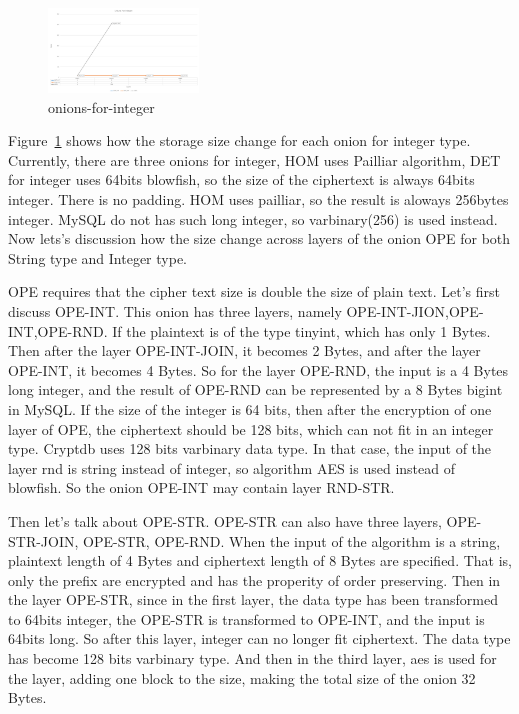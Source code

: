 \begin{figure}[tb]
\centering
\includegraphics[width=4cm]{images/onions-for-integer.png}
\caption{onions-for-integer}
\label{fig:stack6}
\end{figure}


Figure~\ref{fig:stack6} shows how the storage size change for each onion for integer type. Currently, there are three onions for integer, HOM uses Pailliar algorithm, DET for integer uses 64bits blowfish, so the size of the ciphertext is always 64bits integer. There is no padding. HOM uses pailliar, so the result is aloways 256bytes integer. MySQL do not has such long integer, so varbinary(256) is used instead. Now lets's discussion how the size change across layers of the onion OPE for both String type and Integer type. 



OPE requires that the cipher text size is double the size of plain text. Let's first discuss OPE-INT. This onion has three layers, namely OPE-INT-JION,OPE-INT,OPE-RND. If the plaintext is of the type tinyint, which has only 1 Bytes. Then after the layer OPE-INT-JOIN, it becomes 2 Bytes, and after the layer OPE-INT, it becomes 4 Bytes. So for the layer OPE-RND, the input is a 4 Bytes long integer, and the result of OPE-RND can be represented by a 8 Bytes bigint in MySQL. If the size of the integer is 64 bits, then after the encryption of one layer of OPE, the ciphertext should be 128 bits, which can not fit in an integer type. Cryptdb uses 128 bits varbinary data type. In that case, the input of the layer rnd is string instead of integer, so algorithm AES is used instead of blowfish. So the onion OPE-INT may contain layer RND-STR. 

Then let's talk about OPE-STR. OPE-STR can also have three layers, OPE-STR-JOIN, OPE-STR, OPE-RND. When the input of the algorithm is a string, plaintext length of 4 Bytes and  ciphertext length of 8 Bytes are specified. That is, only the prefix are encrypted and has the properity of order preserving. Then in the layer OPE-STR, since in the first layer, the data type has been transformed to 64bits integer, the OPE-STR is transformed to OPE-INT, and the input is 64bits long. So after this layer, integer can no longer fit ciphertext. The data type has become 128 bits varbinary type. And then in the third layer, aes is used for the layer, adding one block to the size, making the total size of the onion 32 Bytes.


